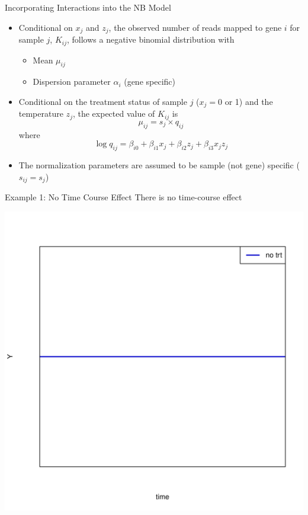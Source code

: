 \documentclass[xcolor=x11names,compress]{beamer}\usepackage[]{graphicx}\usepackage[]{color}
\newenvironment{knitrout}{}{} %
\begin{document}
\begin{frame}{Incorporating Interactions into the NB Model}
  \begin{itemize}
     \item Conditional on $x_j$ and $z_j$, the observed number of reads mapped to gene $i$ for sample $j$, $K_{ij}$, follows a 
     negative binomial distribution with
    \begin{itemize}
    \item Mean $\mu_{ij}$ 
    \item Dispersion parameter $\alpha_i$ (gene specific)
    \end{itemize}
  \item Conditional on the treatment status of sample $j$ ($x_j=0$ or 1) and the temperature $z_j$, 
    the expected value of $K_{ij}$ is
    \begin{equation*}
      \mu_{ij} = s_{j} \times q_{ij}
    \end{equation*}
  where
    \begin{equation*}
     \log q_{ij} =\beta_{i0} + \beta_{i1} x_j + \beta_{i2} z_j + \beta_{i3} x_j z_j
    \end{equation*}
    \item The normalization parameters are assumed to be sample (not gene) specific ($s_{ij}=s_j$)
  \end{itemize}
\end{frame}

  
\begin{frame}{Example 1: No Time Course Effect}
  There is no time-course effect
\begin{knitrout}\tiny
{}\color{fgcolor}

{\centering \includegraphics[width=.6\linewidth]{figure/beamer-unnamed-chunk-95-1} 

}



\end{knitrout}
\end{frame}
\end{document}
